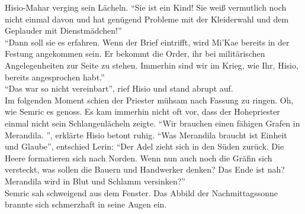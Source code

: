 Hisio-Mahar verging sein Lächeln. ``Sie ist ein Kind! Sie weiß vermutlich noch nicht einmal davon 
und hat genügend Probleme mit der Kleiderwahl und dem Geplauder mit Dienstmädchen!''\\
``Dann soll sie es erfahren. Wenn der Brief eintrifft, wird Mi'Kae bereits in der Festung 
angekommen sein. Er bekommt die Order, ihr bei militärischen Angelegenheiten zur Seite zu stehen. 
Immerhin sind wir im Krieg, wie Ihr, Hisio, bereits angesprochen habt.''\\
``Das war so nicht vereinbart'', rief Hisio und stand abrupt auf.\\
Im folgenden Moment schien der Priester mühsam nach Fassung zu ringen. Oh, wie Semric es genoss. Es 
kam immerhin nicht oft vor, dass der Hohepriester einmal nicht sein Schlangenlächeln zeigte.
``Wir brauchen einen fähigen Grafen in Merandila. '', erklärte Hisio betont ruhig.
``Was Merandila braucht ist Einheit und Glaube'', entschied Lerin: ``Der Adel zieht sich in den 
Süden zurück. Die Heere formatieren sich nach Norden. Wenn nun auch noch die Gräfin sich versteckt, 
was sollen die Bauern und Handwerker denken? Das Ende ist nah? Merandila wird in Blut und Schlamm 
versinken?''\\
Semric sah schweigend aus dem Fenster. Das Abbild der Nachmittagssonne brannte sich schmerzhaft in 
seine Augen ein.\\

